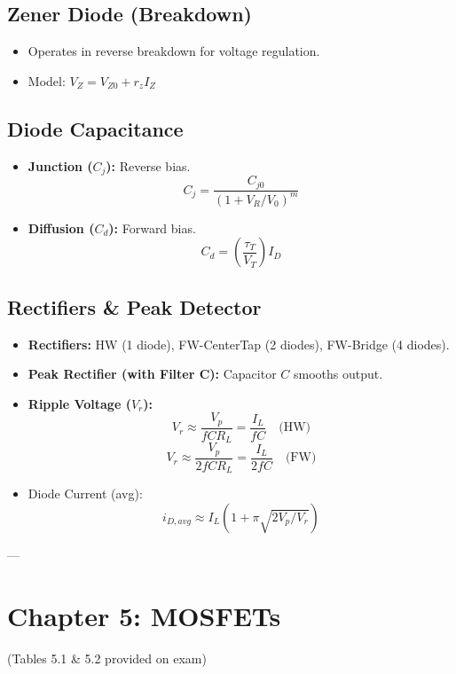 \documentclass[10pt]{article}
\begin{document}
\begin{multicols*}{2}
\subsection*{Zener Diode (Breakdown)}
\begin{itemize}\itemsep0pt
    \item Operates in reverse breakdown for voltage regulation.
    \item Model: $V_Z = V_{Z0} + r_z I_Z$
\end{itemize}

\subsection*{Diode Capacitance}
\begin{itemize}\itemsep0pt
    \item \textbf{Junction ($C_j$):} Reverse bias.
    \[ C_j = \frac{C_{j0}}{(1 + V_R/V_0)^m} \]
    \item \textbf{Diffusion ($C_d$):} Forward bias.
    \[ C_d = \left(\frac{\tau_T}{V_T}\right) I_D \]
\end{itemize}

\subsection*{Rectifiers \& Peak Detector}
\begin{itemize}\itemsep0pt
    \item \textbf{Rectifiers:} HW (1 diode), FW-CenterTap (2 diodes), FW-Bridge (4 diodes).
    \item \textbf{Peak Rectifier (with Filter C):}
    Capacitor $C$ smooths output.
    \item \textbf{Ripple Voltage ($V_r$):}
    \[ V_r \approx \frac{V_p}{fCR_L} = \frac{I_L}{fC} \quad \text{(HW)} \]
    \[ V_r \approx \frac{V_p}{2fCR_L} = \frac{I_L}{2fC} \quad \text{(FW)} \]
    \item Diode Current (avg):
    \[ i_{D,avg} \approx I_L(1 + \pi\sqrt{2V_p/V_r}) \]
\end{itemize}

--- %

\section{Chapter 5: MOSFETs}
(Tables 5.1 \& 5.2 provided on exam)


\end{multicols*}
\end{document}
